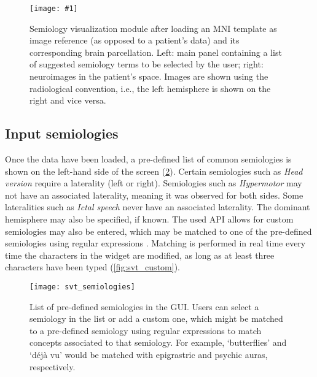\newcommand{\svtscreenshot}[1]{
  \texttt{[image: \#1]}
}

\begin{figure}
  \centering
  \svtscreenshot{svt_loaded}
  \caption[Semiology visualization module after loading a patient's data]{
    Semiology visualization module after loading an \ac{MNI} template as image reference (as opposed to a patient's data) and its corresponding brain parcellation.
    Left: main panel containing a list of suggested semiology terms to be selected by the user;
    right: neuroimages in the patient's space.
    Images are shown using the radiological convention, i.e., the left hemisphere is shown on the right and vice versa.
  }
  \label{fig:svt_loaded}
\end{figure}


\subsection{Input semiologies}
\label{sec:svt_semiologies}

Once the data have been loaded, a pre-defined list of common semiologies is shown on the left-hand side of the screen (\cref{fig:svt_semiologies}).
Certain semiologies such as \textit{Head version} require a laterality (left or right).
Semiologies such as \textit{Hypermotor} may not have an associated laterality, meaning it was observed for both sides.
Some lateralities such as \textit{Ictal speech} never have an associated laterality.
The dominant hemisphere may also be specified, if known.
The used \ac{API} allows for custom semiologies may also be entered, which may be matched to one of the pre-defined semiologies using regular expressions \cite{alim-marvasti_mapping_2021}.
Matching is performed in real time every time the characters in the widget are modified, as long as at least three characters have been typed (\cref{fig:svt_custom}).

\begin{figure}
  \centering
  \texttt{[image: svt\_semiologies]}
  \caption[List of pre-defined semiologies in the GUI]{
    List of pre-defined semiologies in the \ac{GUI}.
    Users can select a semiology in the list or add a custom one, which might be matched to a pre-defined semiology using regular expressions to match concepts associated to that semiology.
    For example, `butterflies' and `déjà vu' would be matched with epigrastric and psychic auras, respectively.
  }
  \label{fig:svt_semiologies}
\end{figure}

